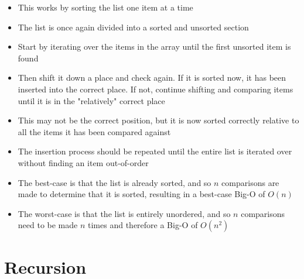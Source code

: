 \begin{itemize}
\begin{itemize}
    \item This works by sorting the list one item at a time
    \item The list is once again divided into a sorted and unsorted section
    \item Start by iterating over the items in the array until the first unsorted item is found
    \item Then shift it down a place and check again. If it is sorted now, it has been inserted into the correct place. If not, continue shifting and comparing items until it is in the "relatively" correct place
    \item This may not be the correct position, but it is now sorted correctly relative to all the items it has been compared against
    \item The insertion process should be repeated until the entire list is iterated over without finding an item out-of-order
    \item The best-case is that the list is already sorted, and so $n$ comparisons are made to determine that it is sorted, resulting in a best-case Big-O of $O(n)$
    \item The worst-case is that the list is entirely unordered, and so $n$ comparisons need to be made $n$ times and therefore a Big-O of $O(n^2)$
  \end{itemize}
\end{itemize}

\section*{Recursion}

